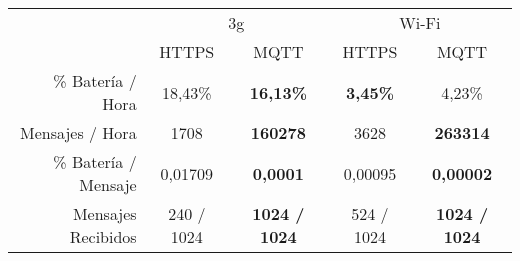\begin{tabular}{|r|c|c|c|c|}
  \hhline{~--|--|}
  \rowcolor[HTML]{FFEAD0}
  \multicolumn{1}{c|}{\cellcolor[HTML]{FFFFFF}} & \multicolumn{2}{c|}{3g} & \multicolumn{2}{c|}{Wi-Fi} \\
  \hhline{~|-|-|-|-|}
  \rowcolor[HTML]{E3FFE3}
  \multicolumn{1}{c|}{\cellcolor[HTML]{FFFFFF}} & \multicolumn{1}{c|}{HTTPS} & MQTT & HTTPS & MQTT \\
  \hline
  \cellcolor[HTML]{E4FFFE}\% Batería / Hora & 18,43\% & \textbf{16,13\%} & \textbf{3,45\%} & 4,23\% \\
  \hline
  \cellcolor[HTML]{E4FFFE}Mensajes / Hora & 1708 & \textbf{160278} & 3628 & \textbf{263314} \\
  \hline
  \cellcolor[HTML]{E4FFFE}\% Batería / Mensaje & 0,01709 & \textbf{0,0001} & 0,00095 & \textbf{0,00002} \\
  \hline
  \cellcolor[HTML]{E4FFFE}Mensajes Recibidos & 240 / 1024 & \textbf{1024 / 1024} & 524 / 1024 & \textbf{1024 / 1024} \\
  \hline
\end{tabular}